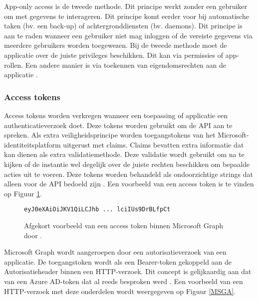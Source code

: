 App-only access is de tweede methode. Dit principe werkt zonder een gebruiker om met gegevens te interageren. Dit principe komt eerder voor bij automatische taken (bv. een back-up) of achtergronddiensten (bv. daemons). Dit principe is aan te raden wanneer een gebruiker niet mag inloggen of de vereiste gegevens via meerdere gebruikers worden toegewezen. Bij de tweede methode moet de applicatie over de juiste privileges beschikken. Dit kan via permissies of app-rollen. Een andere manier is via toekennen van eigendomsrechten aan de applicatie \autocite{Microsoft2022b}. 

\subsubsection{Access tokens}

Access tokens worden verkregen wanneer een toepassing of applicatie een authenticatieverzoek doet. Deze tokens worden gebruikt om de \ac{API} aan te spreken. Als extra veiligheidsprincipe worden toegangstokens van het Microsoft-identiteitsplatform uitgerust met claims. Claims bevatten extra informatie dat kan dienen als extra validatiemethode. Deze validatie wordt gebruikt om na te kijken of de instantie wel degelijk over de juiste rechten beschikken om bepaalde acties uit te voeren. Deze tokens worden behandeld als ondoorzichtige strings dat alleen voor de \ac{API} bedoeld zijn \autocite{Microsoft2022b}. Een voorbeeld van een access token is te vinden op Figuur \ref{MSGAT}. \\

\begin{figure}[h]
    \scriptsize
    \begin{verbatim}        
eyJ0eXAiOiJKV1QiLCJhb ... lciIUs9DrBLfpCt
    \end{verbatim}    
    \caption[Afgekort voorbeeld Microsoft Graph access token]{Afgekort voorbeeld van een access token binnen Microsoft Graph door \textcite{Microsoft2022b}.}
    \label{MSGAT}
\end{figure}

Microsoft Graph wordt aangeroepen door een autorisatieverzoek van een applicatie. De toegangstoken wordt als een Bearer-token gekoppeld aan de Autorisatieheader binnen een \ac{HTTP}-verzoek. Dit concept is gelijkaardig aan dat van een Azure \ac{AD}-token dat al reeds besproken werd \autocite{Microsoft2022b}. Een voorbeeld van een \ac{HTTP}-verzoek met deze onderdelen wordt weergegeven op Figuur \ref{MSGA}. \\

